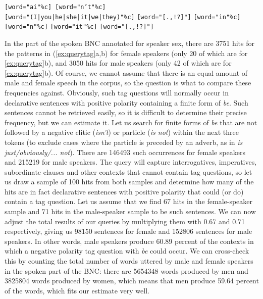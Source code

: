 \begin{exe}
\ex
\begin{xlist}
\label{ex:querymoretag}
\ex \texttt{[word="ai"\%c] [word="n't"\%c]} \\
\texttt{[word="(I|you|he|she|it|we|they)"\%c]} \texttt{[word="[.,!?]"]}
\ex \texttt{[word="in"\%c]} \texttt{[word="n"\%c]} \texttt{[word="it"\%c]} \texttt{[word="[.,!?]"]}
\end{xlist}
\end{exe}

In the part of the spoken  BNC  annotated  for speaker sex,  there are \num{3751} hits for the patterns in (\ref{ex:querytag}a,b) for female speakers (only 20 of which are for \ref{ex:querytag}b), and \num{3050} hits for male speakers (only 42 of which are for \ref{ex:querytag}b). Of course, we cannot assume that there is an equal amount of male and female speech in the corpus, so the question is what to compare these frequencies  against. Obviously, such tag questions  will normally occur in declarative sentences with positive polarity containing a finite form of \textit{be}. Such sentences cannot be retrieved  easily, so it is difficult to determine their precise frequency, but we can estimate it. Let us search for finite forms of \textit{be} that are not followed by a negative  clitic  (\textit{isn't}) or particle (\textit{is not}) within the next three tokens (to exclude cases where the particle is preceded by an adverb,  as in \textit{is just\slash obviously/... not}). There are \num{146493} such occurrences for female speakers and \num{215219} for male speakers. The query will capture interrogatives, imperatives, subordinate clauses and other contexts that cannot contain tag questions, so let us draw a sample of 100 hits from both samples and determine how many of the hits are in fact declarative sentences with positive polarity that could (or do) contain a tag question. Let us assume that we find 67 hits in the female\hyp{}speaker sample and 71 hits in the male\hyp{}speaker sample to be such sentences. We can now adjust the total results of our queries by multiplying them with 0.67 and 0.71 respectively, giving us \num{98150} sentences for female and \num{152806} sentences for male speakers.  In other words, male speakers produce 60.89 percent of the contexts in which a negative  polarity tag question  with \textit{be} could occur. We can cross\hyp{}check this by counting the total number of words uttered by male and female speakers in the spoken part of the BNC:  there are \num{5654348} words produced by men and \num{3825804} words produced by women, which means that men produce 59.64 percent of the words, which fits our estimate very well.

